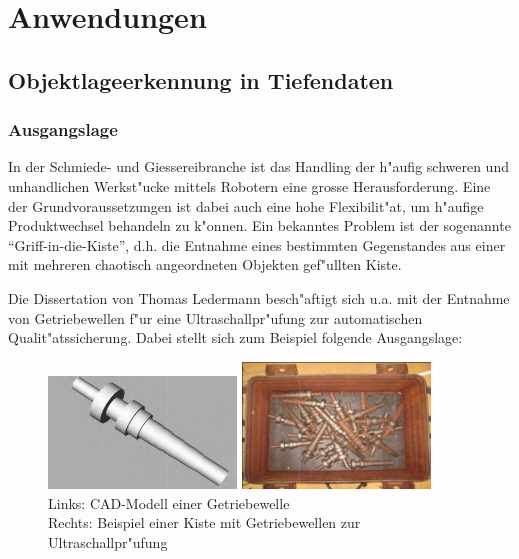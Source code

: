 \section{Anwendungen}

\subsection{Objektlageerkennung in Tiefendaten} 

\subsubsection{Ausgangslage}
In der Schmiede- und Giessereibranche ist das Handling der h"aufig
schweren und unhandlichen Werkst"ucke mittels Robotern eine grosse
Herausforderung. Eine der Grundvoraussetzungen ist dabei auch eine hohe
Flexibilit"at, um h"aufige Produktwechsel behandeln zu k"onnen. Ein
bekanntes Problem ist der sogenannte ``Griff-in-die-Kiste'', d.h. die
Entnahme eines bestimmten Gegenstandes aus einer mit mehreren chaotisch
angeordneten Objekten gef"ullten Kiste.

Die Dissertation \cite{Diss-Ledermann} von Thomas Ledermann
besch"aftigt sich u.a. mit der Entnahme von Getriebewellen f"ur eine
Ultraschallpr"ufung zur automatischen Qualit"atssicherung. Dabei stellt
sich zum Beispiel folgende Ausgangslage:

\begin{figure}[htbp]
	\centering
	\begin{minipage}{6cm}
		\includegraphics[width=5cm]{partikelschwarm/welle-cad}
	\end{minipage}
	\begin{minipage}{6cm}
		\includegraphics[width=5cm]{partikelschwarm/welle-kiste}
	\end{minipage}
	\caption{	Links: CAD-Modell einer Getriebewelle \\
				Rechts: Beispiel einer Kiste mit Getriebewellen zur Ultraschallpr"ufung}
	\label{Fig-Getriebewelle}
\end{figure}

